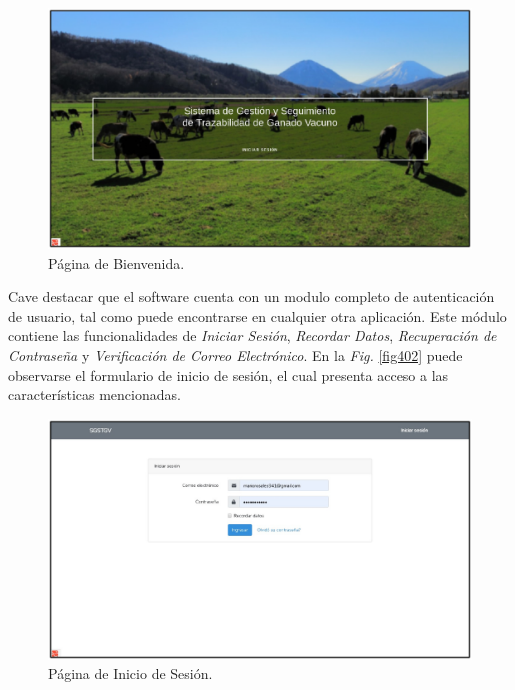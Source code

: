 \documentclass[11pt,oneside]{book}
\begin{document}
\begin{figure}[tbhp]
\centerline{\includegraphics[scale=0.87]{figs/capitulo_3_desarrollo/fig401.pdf}}
\caption{Página de Bienvenida.}
\label{fig401}
\end{figure}

\newpage
Cave destacar que el software cuenta con un modulo completo de autenticación de usuario, tal como puede encontrarse en cualquier otra aplicación. Este módulo contiene las funcionalidades de \textit{Iniciar Sesión}, \textit{Recordar Datos}, \textit{Recuperación de Contraseña} y \textit{Verificación de Correo Electrónico}. En la \textit{Fig.} \eqref{fig402} puede observarse el formulario de inicio de sesión, el cual presenta acceso a las características mencionadas.

\begin{figure}[tbhp]
\centerline{\includegraphics[scale=0.87]{figs/capitulo_3_desarrollo/fig402.pdf}}
\caption{Página de Inicio de Sesión.}
\label{fig402}
\end{figure}
\end{document}
